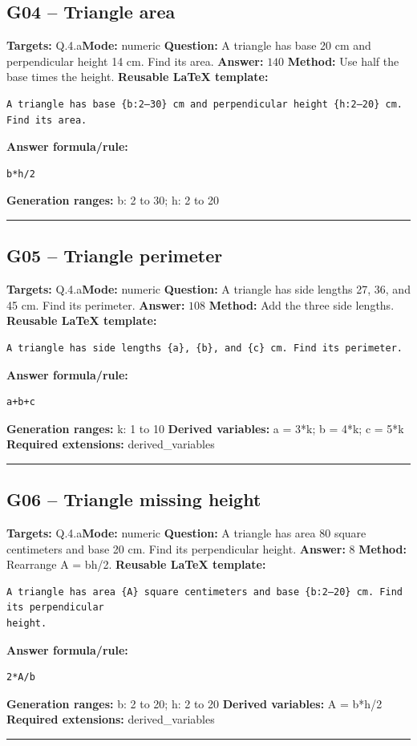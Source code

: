 \documentclass[11pt]{article}
\begin{document}
\subsection{G04 -- Triangle area}
\textbf{Targets:} Q.4.a\quad\textbf{Mode:} numeric
\textbf{Question:} A triangle has base 20 cm and perpendicular height 14 cm. Find its area.
\textbf{Answer:} \(140\)
\textbf{Method:} Use half the base times the height.
\textbf{Reusable LaTeX template:}
\begin{verbatim}
A triangle has base {b:2–30} cm and perpendicular height {h:2–20} cm. Find its area.
\end{verbatim}
\textbf{Answer formula/rule:}
\begin{verbatim}
b*h/2
\end{verbatim}
\textbf{Generation ranges:} b: 2 to 30; h: 2 to 20
\medskip\hrule\medskip
\subsection{G05 -- Triangle perimeter}
\textbf{Targets:} Q.4.a\quad\textbf{Mode:} numeric
\textbf{Question:} A triangle has side lengths 27, 36, and 45 cm. Find its perimeter.
\textbf{Answer:} \(108\)
\textbf{Method:} Add the three side lengths.
\textbf{Reusable LaTeX template:}
\begin{verbatim}
A triangle has side lengths {a}, {b}, and {c} cm. Find its perimeter.
\end{verbatim}
\textbf{Answer formula/rule:}
\begin{verbatim}
a+b+c
\end{verbatim}
\textbf{Generation ranges:} k: 1 to 10
\textbf{Derived variables:} a = 3*k; b = 4*k; c = 5*k
\textbf{Required extensions:} derived\_variables
\medskip\hrule\medskip
\subsection{G06 -- Triangle missing height}
\textbf{Targets:} Q.4.a\quad\textbf{Mode:} numeric
\textbf{Question:} A triangle has area 80 square centimeters and base 20 cm. Find its perpendicular height.
\textbf{Answer:} \(8\)
\textbf{Method:} Rearrange A = bh/2.
\textbf{Reusable LaTeX template:}
\begin{verbatim}
A triangle has area {A} square centimeters and base {b:2–20} cm. Find its perpendicular
height.
\end{verbatim}
\textbf{Answer formula/rule:}
\begin{verbatim}
2*A/b
\end{verbatim}
\textbf{Generation ranges:} b: 2 to 20; h: 2 to 20
\textbf{Derived variables:} A = b*h/2
\textbf{Required extensions:} derived\_variables
\medskip\hrule\medskip
\end{document}
